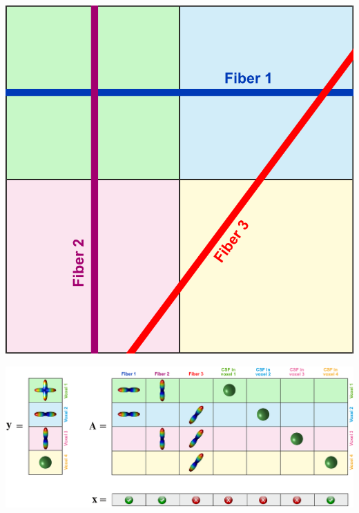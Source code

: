 \documentclass[aspectratio=169]{beamer}
\begin{document}
\begin{frame}
\begin{center}
\begin{minipage}{.15\linewidth}
\begin{center}
		\includegraphics[width=\linewidth]{img/commit/COMMIT_idea_2_var}
		\end{center}
		\end{minipage}
		
		\includegraphics[width=.8\linewidth]{img/commit/COMMIT_idea_8}
		\end{center}
		\end{frame}
		
\end{document}
